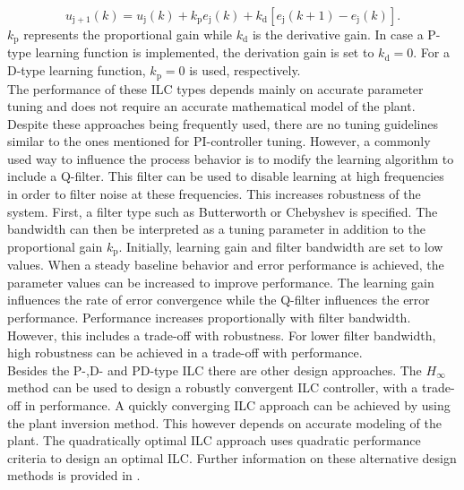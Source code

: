  \begin{equation}
     u_{\mathrm{j+1}}(k) = u_{\mathrm{j}}(k)+k_{\mathrm{p}}e_{\mathrm{j}}(k)+k_{\mathrm{d}}[e_{\mathrm{j}}(k+1)-e_{\mathrm{j}}(k)].
  \label{eq:PD_type_2}
  \end{equation}
$k_{\mathrm{p}}$ represents the proportional gain while $k_{\mathrm{d}}$ is the derivative gain. In case a P-type learning function is implemented, the derivation gain is set to $k_{\mathrm{d}}=0$. For a D-type learning function, $k_{\mathrm{p}}=0$ is used, respectively.
\\The performance of these ILC types depends mainly on accurate parameter tuning and does not require an accurate mathematical model of the plant. Despite these approaches being frequently used, there are no tuning guidelines similar to the ones mentioned for PI-controller tuning. However, a commonly used way to influence the process behavior is to modify the learning algorithm to include a Q-filter. This filter can be used to disable learning at high frequencies in order to filter noise at these frequencies. This increases robustness of the system. First, a filter type such as Butterworth or Chebyshev is specified. The bandwidth can then be interpreted as a tuning parameter in addition to the proportional gain $k_{\mathrm{p}}$. Initially, learning gain and filter bandwidth are set to low values. When a steady baseline behavior and error performance is achieved, the parameter values can be increased to improve performance. The learning gain influences the rate of error convergence while the Q-filter influences the error performance. Performance increases proportionally with filter bandwidth. However, this includes a trade-off with robustness. For lower filter bandwidth, high robustness can be achieved in a trade-off with performance.
\\Besides the P-,D- and PD-type ILC there are other design approaches. The $H_{\infty}$ method can be used to design a robustly convergent ILC controller, with a trade-off in performance. A quickly converging ILC approach can be achieved by using the plant inversion method. This however depends on accurate modeling of the plant. The quadratically optimal ILC approach uses quadratic performance criteria to design an optimal ILC. Further information on these alternative design methods is provided in \cite{ILC2}.
